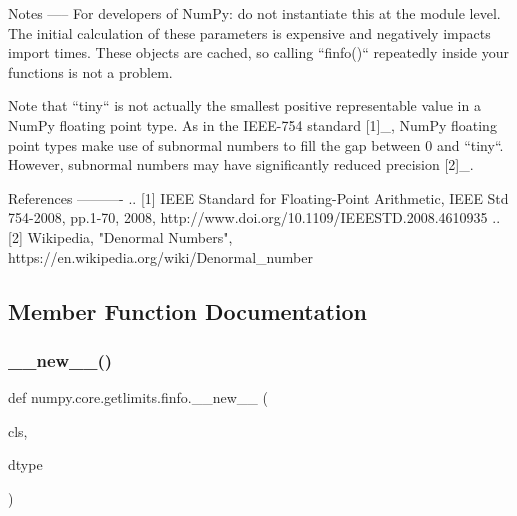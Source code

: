 \begin{DoxyVerb}
Notes
-----
For developers of NumPy: do not instantiate this at the module level.
The initial calculation of these parameters is expensive and negatively
impacts import times.  These objects are cached, so calling ``finfo()``
repeatedly inside your functions is not a problem.

Note that ``tiny`` is not actually the smallest positive representable
value in a NumPy floating point type. As in the IEEE-754 standard [1]_,
NumPy floating point types make use of subnormal numbers to fill the
gap between 0 and ``tiny``. However, subnormal numbers may have
significantly reduced precision [2]_.

References
----------
.. [1] IEEE Standard for Floating-Point Arithmetic, IEEE Std 754-2008,
       pp.1-70, 2008, http://www.doi.org/10.1109/IEEESTD.2008.4610935
.. [2] Wikipedia, "Denormal Numbers",
       https://en.wikipedia.org/wiki/Denormal_number
\end{DoxyVerb}
 

\subsection{Member Function Documentation}
\mbox{\label{classnumpy_1_1core_1_1getlimits_1_1finfo_acd380768bde6ef5287567498f9861dd4}} 
\subsubsection{\texorpdfstring{\+\_\+\+\_\+new\+\_\+\+\_\+()}{\_\_new\_\_()}}
{\footnotesize\ttfamily def numpy.\+core.\+getlimits.\+finfo.\+\_\+\+\_\+new\+\_\+\+\_\+ (\begin{DoxyParamCaption}\item[{}]{cls,  }\item[{}]{dtype }\end{DoxyParamCaption})}

\mbox{\label{classnumpy_1_1core_1_1getlimits_1_1finfo_aff63cb930aa0fbbb6f2a5dc3cc81d37c}} 
